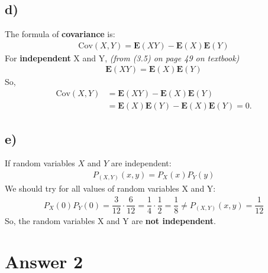 \documentclass[12pt]{article}
\begin{document}
\subsection*{d)}
The formula of \textbf{covariance} is:
\begin{equation}
    \begin{split}
        \text{Cov}(X, Y) = \textbf{E}(XY) - \textbf{E}(X)\textbf{E}(Y) 
    \end{split}
\end{equation}
For \textbf{independent} X and Y, \textit{(from (3.5) on page 49 on textbook)}
\begin{equation}
    \begin{split}
        \textbf{E}(XY) = \textbf{E}(X)\textbf{E}(Y)
    \end{split}
\end{equation}
So, 
\begin{equation}
    \begin{split}
        \text{Cov}(X,Y) &= \textbf{E}(XY) - \textbf{E}(X)\textbf{E}(Y)\\
                        &= \textbf{E}(X)\textbf{E}(Y) - \textbf{E}(X)\textbf{E}(Y) = 0.
    \end{split}
\end{equation}
\subsection*{e)}
If random variables $X$ and $Y$ are independent:
\begin{equation}
    \begin{split}
        P_{(X,Y)}(x,y) = P_X (x) P_Y (y)
    \end{split}
\end{equation}
We should try for all values of random variables X and Y:
\begin{equation}
    \begin{split}
        P_X (0) P_Y (0) = \dfrac{3}{12} \cdot \dfrac{6}{12} = \dfrac{1}{4} \cdot \dfrac{1}{2} = \dfrac{1}{8} \neq P_{(X,Y)}(x,y) = \dfrac{1}{12}
    \end{split}
\end{equation} 
So, the random variables X and Y are \textbf{not independent}.
\section*{Answer 2}
\end{document}
